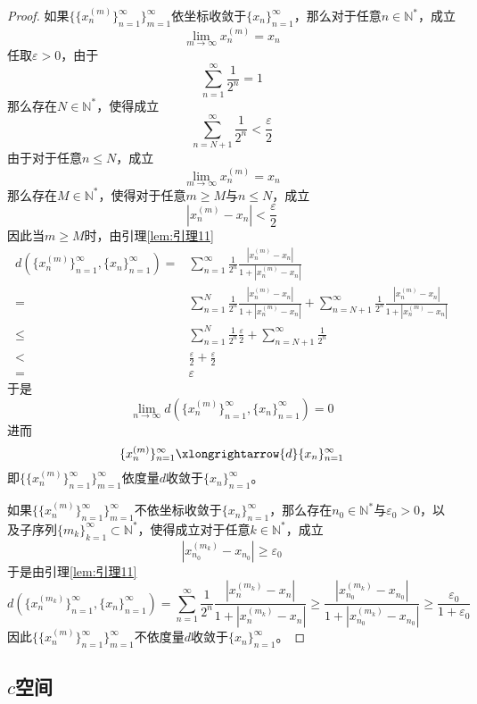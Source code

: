 \documentclass[lang = cn, scheme = chinese, thmcnt = section]{elegantbook}
\newcommand{\N}{\mathbb{N}}            %
\newcommand{\sub}{\subset}             %
\begin{document}
\begin{proof}
	如果$\{\{x_n^{(m)}\}_{n=1}^{\infty}\}_{m=1}^{\infty}$依坐标收敛于$\{x_n\}_{n=1}^{\infty}$，那么对于任意$n\in\N^*$，成立
	$$
	\lim_{m\to\infty}x_n^{(m)}=x_n
	$$
	任取$\varepsilon>0$，由于
	$$
	\sum_{n=1}^{\infty}\frac{1}{2^n}=1
	$$
	那么存在$N\in\N^*$，使得成立
	$$
	\sum_{n=N+1}^{\infty}\frac{1}{2^n}<\frac{\varepsilon}{2}
	$$
	由于对于任意$n\le N$，成立
	$$
	\lim_{m\to\infty}x_n^{(m)}=x_n
	$$
	那么存在$M\in\N^*$，使得对于任意$m\ge M$与$n\le N$，成立
	$$
	|x_n^{(m)}-x_n|<\frac{\varepsilon}{2}
	$$
	因此当$m\ge M$时，由引理\ref{lem:引理11}
	\begin{align*}
		d(\{x_n^{(m)}\}_{n=1}^{\infty},\{x_n\}_{n=1}^{\infty})
		= & \sum_{n=1}^{\infty}\frac{1}{2^n}\frac{|x_n^{(m)}-x_n|}{1+|x_n^{(m)}-x_n|}\\
		= & \sum_{n=1}^{N}\frac{1}{2^n}\frac{|x_n^{(m)}-x_n|}{1+|x_n^{(m)}-x_n|}+
		\sum_{n=N+1}^{\infty}\frac{1}{2^n}\frac{|x_n^{(m)}-x_n|}{1+|x_n^{(m)}-x_n|}\\
		\le & \sum_{n=1}^{N}\frac{1}{2^n}\frac{\varepsilon}{2}+
		\sum_{n=N+1}^{\infty}\frac{1}{2^n}\\
		< & \frac{\varepsilon}{2}+\frac{\varepsilon}{2}\\
		= & \varepsilon
	\end{align*}
	于是
	$$
	\lim_{n\to\infty}d(\{x_n^{(m)}\}_{n=1}^{\infty},\{x_n\}_{n=1}^{\infty})=0
	$$
	进而
	$$
	\{x_n^{(m)}\}_{n=1}^{\infty}\xlongrightarrow{d}\{x_n\}_{n=1}^{\infty}
	$$
	即$\{\{x_n^{(m)}\}_{n=1}^{\infty}\}_{m=1}^{\infty}$依度量$d$收敛于$\{x_n\}_{n=1}^{\infty}$。
	
	
	如果$\{\{x_n^{(m)}\}_{n=1}^{\infty}\}_{m=1}^{\infty}$不依坐标收敛于$\{x_n\}_{n=1}^{\infty}$，那么存在$n_0\in\N^*$与$\varepsilon_0>0$，以及子序列$\{m_k\}_{k=1}^{\infty}\sub \N^*$，使得成立对于任意$k\in\N^*$，成立
	$$
	|x_{n_0}^{(m_k)}-x_{n_0}|\ge \varepsilon_0
	$$
	于是由引理\ref{lem:引理11}
	$$
	d(\{x_n^{(m_k)}\}_{n=1}^{\infty},\{x_n\}_{n=1}^{\infty})
	=  \sum_{n=1}^{\infty}\frac{1}{2^n}\frac{|x_n^{(m_k)}-x_n|}{1+|x_n^{(m_k)}-x_n|}
	\ge  \frac{|x_{n_0}^{(m_k)}-x_{n_0}|}{1+|x_{n_0}^{(m_k)}-x_{n_0}|}
	\ge  \frac{\varepsilon_0}{1+\varepsilon_0}
	$$
	因此$\{\{x_n^{(m)}\}_{n=1}^{\infty}\}_{m=1}^{\infty}$不依度量$d$收敛于$\{x_n\}_{n=1}^{\infty}$。
\end{proof}

\subsection{$c$空间}
\end{document}

